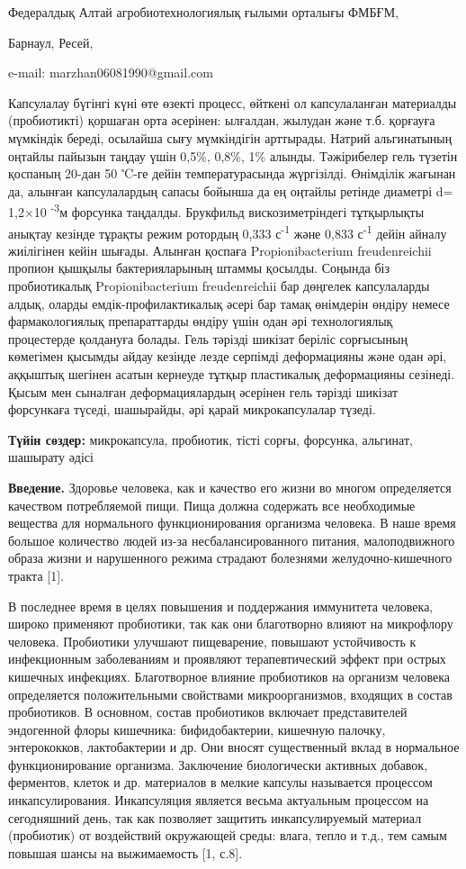 Федералдық Алтай агробиотехнологиялық ғылыми орталығы ФМБҒМ,

Барнаул, Ресей,

e-mail: marzhan06081990@gmail.com

Капсулалау бүгінгі күні өте өзекті процесс, өйткені ол капсулаланған
материалды (пробиотикті) қоршаған орта әсерінен: ылғалдан, жылудан және
т.б. қорғауға мүмкіндік береді, осылайша сығу мүмкіндігін арттырады.
Натрий альгинатының оңтайлы пайызын таңдау үшін 0,5\%, 0,8\%, 1\%
алынды. Тәжірибелер гель түзетін қоспаның 20-дан 50 ℃-ге дейін
температурасында жүргізілді. Өнімділік жағынан да, алынған капсулалардың
сапасы бойынша да ең оңтайлы ретінде диаметрі d= 1,2×10
\textsuperscript{-3}м форсунка таңдалды. Брукфильд вискозиметріндегі
тұтқырлықты анықтау кезінде тұрақты режим ротордың 0,333
с\textsuperscript{-1} және 0,833 с\textsuperscript{-1} дейін айналу
жиілігінен кейін шығады. Алынған қоспаға Propionibacterium
freudenreichii пропион қышқылы бактерияларының штаммы қосылды. Соңында
біз пробиотикалық Propionibacterium freudenreichii бар дөңгелек
капсулаларды алдық, оларды емдік-профилактикалық әсері бар тамақ
өнімдерін өндіру немесе фармакологиялық препараттарды өндіру үшін одан
әрі технологиялық процестерде қолдануға болады. Гель тәрізді шикізат
беріліс сорғысының көмегімен қысымды айдау кезінде лезде серпімді
деформацияны және одан әрі, аққыштық шегінен асатын кернеуде тұтқыр
пластикалық деформацияны сезінеді. Қысым мен сыналған деформациялардың
әсерінен гель тәрізді шикізат форсункаға түседі, шашырайды, әрі қарай
микрокапсулалар түзеді.

{\bfseries Түйін сөздер:} микрокапсула, пробиотик, тісті сорғы, форсунка,
альгинат, шашырату әдісі

{\bfseries Введение.} Здоровье человека, как и качество его жизни во многом
определяется качеством потребляемой пищи. Пища должна содержать все
необходимые вещества для нормального функционирования организма
человека. В наше время большое количество людей из-за
несбалансированного питания, малоподвижного образа жизни и нарушенного
режима страдают болезнями желудочно-кишечного тракта {[}1{]}.

В последнее время в целях повышения и поддержания иммунитета человека,
широко применяют пробиотики, так как они благотворно влияют на
микрофлору человека. Пробиотики улучшают пищеварение, повышают
устойчивость к инфекционным заболеваниям и проявляют терапевтический
эффект при острых кишечных инфекциях. Благотворное влияние пробиотиков
на организм человека определяется положительными свойствами
микроорганизмов, входящих в состав пробиотиков. В основном, состав
пробиотиков включает представителей эндогенной флоры кишечника:
бифидобактерии, кишечную палочку, энтерококков, лактобактерии и др. Они
вносят существенный вклад в нормальное функционирование организма.
Заключение биологически активных добавок, ферментов, клеток и др.
материалов в мелкие капсулы называется процессом инкапсулирования.
Инкапсуляция является весьма актуальным процессом на сегодняшний день,
так как позволяет защитить инкапсулируемый материал (пробиотик) от
воздействий окружающей среды: влага, тепло и т.д., тем самым повышая
шансы на выжимаемость {[}1, с.8{]}.

